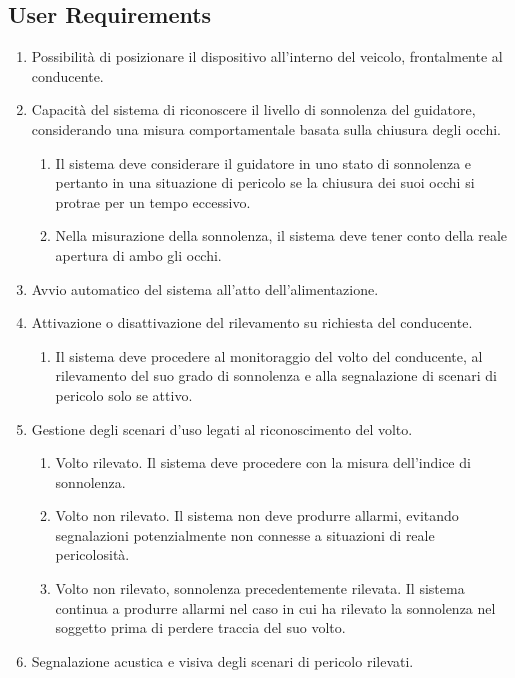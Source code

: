 \documentclass[12pt]{article}
\begin{document}
\subsection{User Requirements}
\begin{enumerate}
	\item Possibilità di posizionare il dispositivo all'interno del veicolo, frontalmente al conducente.
	\item Capacità del sistema di riconoscere il livello di sonnolenza del guidatore, considerando una misura comportamentale basata sulla chiusura degli occhi.
	\begin{enumerate}
		\item Il sistema deve considerare il guidatore in uno stato di sonnolenza e pertanto in una situazione di pericolo se la chiusura dei suoi occhi si protrae per un tempo eccessivo.
		\item Nella misurazione della sonnolenza, il sistema deve tener conto della reale apertura di ambo gli occhi.
	\end{enumerate}
	\item Avvio automatico del sistema all'atto dell'alimentazione.
	\item Attivazione o disattivazione del rilevamento su richiesta del conducente.
	\begin{enumerate}
		\item Il sistema deve procedere al monitoraggio del volto del conducente, al rilevamento del suo grado di sonnolenza e alla segnalazione di scenari di pericolo solo se attivo.
	\end{enumerate}
	\item Gestione degli scenari d'uso legati al riconoscimento del volto.
	\begin{enumerate}
		\item Volto rilevato. Il sistema deve procedere con la misura dell'indice di sonnolenza.
		\item Volto non rilevato. Il sistema non deve produrre allarmi, evitando segnalazioni potenzialmente non connesse a situazioni di reale pericolosità.
		\item Volto non rilevato, sonnolenza precedentemente rilevata. Il sistema continua a produrre allarmi nel caso in cui ha rilevato la sonnolenza nel soggetto prima di perdere traccia del suo volto.
	\end{enumerate}
	\item Segnalazione acustica e visiva degli scenari di pericolo rilevati.
\end{enumerate}
\end{document}
